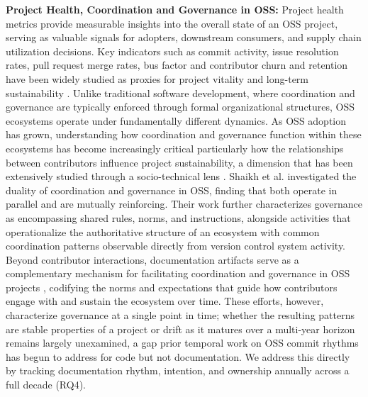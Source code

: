 \documentclass[10pt,conference]{IEEEtran}
\begin{document}
\noindent \textbf{ { Project Health, Coordination and Governance in OSS:}}
Project health metrics provide measurable insights into the overall state of an OSS project, serving as valuable signals for adopters, downstream consumers, and supply chain utilization decisions. Key indicators such as commit activity, issue resolution rates, pull request merge rates, bus factor and contributor churn and retention have been widely studied as proxies for project vitality and long-term sustainability \cite{goggins2021open,destefanis2025introducing}. Unlike traditional software development, where coordination and governance are typically enforced through formal organizational structures, OSS ecosystems operate under fundamentally different dynamics. As OSS adoption has grown, understanding how coordination and governance function within these ecosystems has become increasingly critical particularly how the relationships between contributors influence project sustainability, a dimension that has been extensively studied through a socio-technical lens \cite{bird2011sociotechnical,aufiero2026coordination}.
Shaikh et al. \cite{shaikh2017governing} investigated the duality of coordination and governance in OSS, finding that both operate in parallel and are mutually reinforcing. Their work further characterizes governance as encompassing shared rules, norms, and instructions, alongside activities that operationalize the authoritative structure of an ecosystem  with common coordination patterns observable directly from version control system activity.
Beyond contributor interactions, documentation artifacts serve as a complementary mechanism for facilitating coordination and governance in OSS projects \cite{github_community_health}, codifying the norms and expectations that guide how contributors engage with and sustain the ecosystem over time.
These efforts, however, characterize governance at a single point in time; whether the resulting patterns are stable properties of a project or drift as it matures over a multi-year horizon remains largely unexamined, a gap prior temporal work on OSS commit rhythms \cite{destefanis2025introducing,adejumo2026commits} has begun to address for code but not documentation. We address this directly by tracking documentation rhythm, intention, and ownership annually across a full decade (RQ4).

\end{document}
